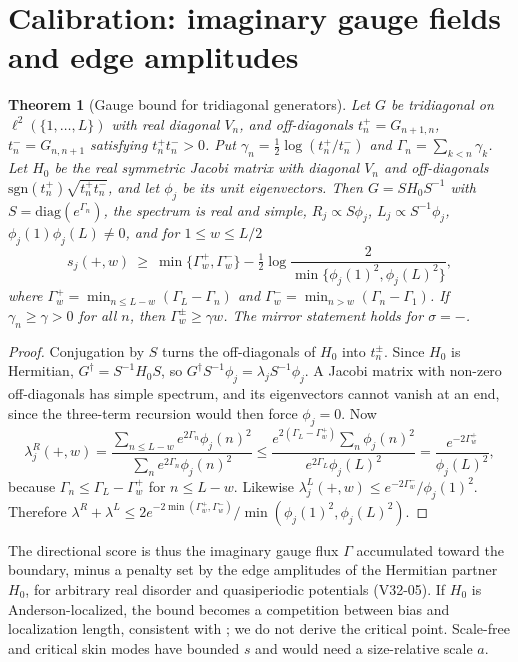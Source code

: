 \documentclass[11pt]{article}
\newtheorem{theorem}{Theorem}
\theoremstyle{definition}
\theoremstyle{remark}
\begin{document}
\section{Calibration: imaginary gauge fields and edge amplitudes}
\label{sec:calib}

\begin{theorem}[Gauge bound for tridiagonal generators]\label{thm:gauge}
Let $G$ be tridiagonal on $\ell^2(\{1,\dots,L\})$ with real diagonal $V_n$, and off-diagonals $t^+_n=G_{n+1,n}$, $t^-_n=G_{n,n+1}$ satisfying $t^+_nt^-_n>0$. Put $\gamma_n=\frac12\log(t^+_n/t^-_n)$ and $\Gamma_n=\sum_{k<n}\gamma_k$. Let $H_0$ be the real symmetric Jacobi matrix with diagonal $V_n$ and off-diagonals $\mathrm{sgn}(t^+_n)\sqrt{t^+_nt^-_n}$, and let $\phi_j$ be its unit eigenvectors. Then $G=SH_0S^{-1}$ with $S=\mathrm{diag}(e^{\Gamma_n})$, the spectrum is real and simple, $R_j\propto S\phi_j$, $L_j\propto S^{-1}\phi_j$, $\phi_j(1)\phi_j(L)\ne0$, and for $1\le w\le L/2$
\[
s_j(+,w)\ \ge\ \min\{\Gamma^+_w,\Gamma^-_w\}-\tfrac12\log\frac{2}{\min\{\phi_j(1)^2,\phi_j(L)^2\}},
\]
where $\Gamma^+_w=\min_{n\le L-w}(\Gamma_L-\Gamma_n)$ and $\Gamma^-_w=\min_{n>w}(\Gamma_n-\Gamma_1)$.
If $\gamma_n\ge\gamma>0$ for all $n$, then $\Gamma^\pm_w\ge\gamma w$. The mirror statement holds for $\sigma=-$.
\end{theorem}
\begin{proof}
Conjugation by $S$ turns the off-diagonals of $H_0$ into $t^\pm_n$. Since $H_0$ is Hermitian, $G^\dagger=S^{-1}H_0S$, so $G^\dagger S^{-1}\phi_j=\lambda_jS^{-1}\phi_j$. A Jacobi matrix with non-zero off-diagonals has simple spectrum, and its eigenvectors cannot vanish at an end, since the three-term recursion would then force $\phi_j=0$. Now
\[
\lambda^R_j(+,w)=\frac{\sum_{n\le L-w}e^{2\Gamma_n}\phi_j(n)^2}{\sum_ne^{2\Gamma_n}\phi_j(n)^2}\le\frac{e^{2(\Gamma_L-\Gamma^+_w)}\sum_n\phi_j(n)^2}{e^{2\Gamma_L}\phi_j(L)^2}=\frac{e^{-2\Gamma^+_w}}{\phi_j(L)^2},
\]
because $\Gamma_n\le\Gamma_L-\Gamma^+_w$ for $n\le L-w$. Likewise $\lambda^L_j(+,w)\le e^{-2\Gamma^-_w}/\phi_j(1)^2$. Therefore $\lambda^R+\lambda^L\le2e^{-2\min(\Gamma^+_w,\Gamma^-_w)}/\min(\phi_j(1)^2,\phi_j(L)^2)$.
\end{proof}

The directional score is thus the imaginary gauge flux $\Gamma$ \cite{HN96} accumulated toward the boundary, minus a penalty set by the edge amplitudes of the Hermitian partner $H_0$, for arbitrary real disorder and quasiperiodic potentials (V32-05). If $H_0$ is Anderson-localized, the bound becomes a competition between bias and localization length, consistent with \cite{HN96,JLYZC19}; we do not derive the critical point. Scale-free \cite{LLG21} and critical \cite{LLMG20} skin modes have bounded $s$ and would need a size-relative scale $a$.
\end{document}
